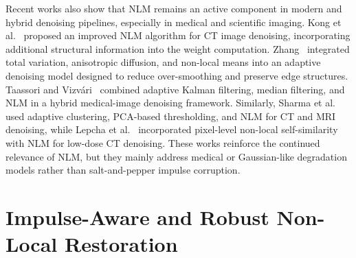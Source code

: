 \documentclass[pdflatex,iicol,sn-mathphys-num]{sn-jnl}
\newcommand{\nlm}{NLM\xspace}
\newif\ifshowportuguese
\newcommand{\pt}[1]{\ifshowportuguese\par\begingroup\small\color{blue!55!black}\noindent\textbf{PT: }#1\par\endgroup\fi}
\begin{document}
Recent works also show that \nlm remains an active component in modern and hybrid denoising pipelines, especially in medical and scientific imaging. Kong et al.~\cite{Kong2024INLMCT} proposed an improved \nlm algorithm for CT image denoising, incorporating additional structural information into the weight computation. Zhang~\cite{Zhang2025AIMSTVNL} integrated total variation, anisotropic diffusion, and non-local means into an adaptive denoising model designed to reduce over-smoothing and preserve edge structures. Taassori and Vizvári~\cite{taassori2024enhancing} combined adaptive Kalman filtering, median filtering, and \nlm in a hybrid medical-image denoising framework. Similarly, Sharma et al.~\cite{sharma2025detail} used adaptive clustering, PCA-based thresholding, and \nlm for CT and MRI denoising, while Lepcha et al.~\cite{lepcha2025low} incorporated pixel-level non-local self-similarity with \nlm for low-dose CT denoising. These works reinforce the continued relevance of \nlm, but they mainly address medical or Gaussian-like degradation models rather than salt-and-pepper impulse corruption.
\pt{Trabalhos recentes também mostram que o \nlm permanece como um componente ativo em pipelines modernos e híbridos de denoising, especialmente em imagens médicas e científicas. Kong et al.~\cite{Kong2024INLMCT} propuseram um algoritmo \nlm melhorado para remoção de ruído em imagens de CT, incorporando informação estrutural adicional ao cálculo dos pesos. Zhang~\cite{Zhang2025AIMSTVNL} integrou variação total, difusão anisotrópica e non-local means em um modelo adaptativo de denoising projetado para reduzir suavização excessiva e preservar estruturas de borda. Taassori e Vizvári~\cite{taassori2024enhancing} combinaram filtragem de Kalman adaptativa, filtro de mediana e \nlm em uma estrutura híbrida de denoising para imagens médicas. De modo semelhante, Sharma et al.~\cite{sharma2025detail} usaram clustering adaptativo, limiarização baseada em PCA e \nlm para denoising de CT e MRI, enquanto Lepcha et al.~\cite{lepcha2025low} incorporaram autossimilaridade não local em nível de pixel com \nlm para denoising de CT de baixa dose. Esses trabalhos reforçam a relevância contínua do \nlm, mas tratam principalmente de imagens médicas ou modelos de degradação semelhantes ao ruído Gaussiano, e não de corrupção impulsiva sal-e-pimenta.}


\section{Impulse-Aware and Robust Non-Local Restoration}
\label{sec:impulse_background}
\end{document}
